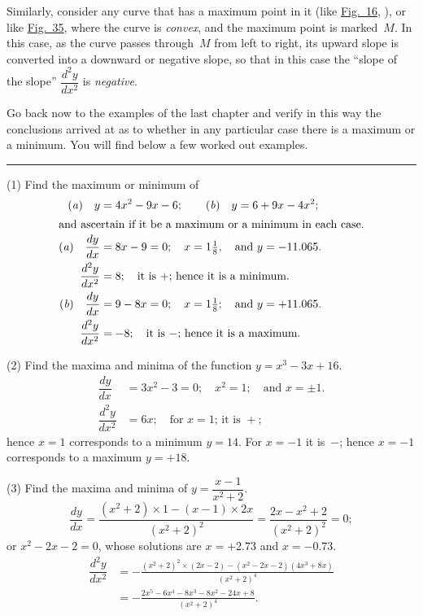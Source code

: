 \documentclass[12pt]{book}[2005/09/16]
\newcommand{\DPPageSep}[2]{\Pagelabel{#2}}
\newcommand{\Pagelabel}[1]
  {\phantomsection\label{#1}}
\newcommand{\Pageref}[2][p.]{%
  \ifthenelse{\not\equal{#1}{}}{%
    \hyperref[#2]{#1~\pageref{#2}}%
  }{%
    \hyperref[#2]{\pageref{#2}}%
  }%
}
\newcommand{\Fig}[1]{\hyperref[fig:#1]{Fig.~#1}}
\newcommand{\tb}[1][1.5in]{%
  \pagebreak[0]\par{\centering\rule{#1}{0.5pt}\pagebreak[3]\par}%
}
\newcommand{\DPtypo}[2]{#2}%
\begin{document}
Similarly, consider any curve that has a maximum
point in it (like \Fig{16}, \Pageref{fig:16}), or like \Fig{35}, where %
the curve is \emph{convex}, and the maximum point is
marked~$M$. In this case, as the curve passes through~$M$
from left to right, its upward slope is converted
\DPPageSep{127.png}{115}%
into a downward or negative slope, so that in this
case the ``slope of the slope'' $\dfrac{d^2y}{dx^2}$ is \emph{negative}.

Go back now to the examples of the last chapter
and verify in this way the conclusions arrived at as to
whether in any particular case there is a maximum
or a minimum. You will find below a few worked
out examples.

\tb

(1) Find the maximum or minimum of
\begin{align*}
\text{(\textit{a})}\quad y &= 4x^2-9x-6; \qquad \text{(\textit{b})}\quad y = 6 + 9x-4x^2; \\
\intertext{and ascertain if it be a maximum or a minimum in
each case.}
\text{(\textit{a})}\quad \dfrac{dy}{dx}
  &= 8x-9=0;\quad x=1\tfrac{1}{8},\quad \text{and } y = -11.065.\\
%
\dfrac{d^2y}{dx^2}
  &= 8;\quad \text{it is~$+$; hence it is a minimum.} \\
%
\text{(\textit{b})}\quad \DPtypo{\dfrac{dx}{dy}}{\dfrac{dy}{dx}}
  &= 9-8x=0;\quad x = 1\tfrac{1}{8};\quad \text{and } y = +11.065.\\
%
\dfrac{d^2y}{dx^2}
  &= -8;\quad \text{it is~$-$; hence it is a maximum.}
\end{align*}

(2) Find the maxima and minima of the function
$y = x^3-3x+16$.
\begin{align*}
\dfrac{dy}{dx}
  &= 3x^2 - 3 = 0;\quad x^2 = 1;\quad \text{and } x = ±1.\\
%
\dfrac{d^2y}{dx^2}
  &= 6x;\quad \text{for $x = 1$; it is~$+$};
\end{align*}
hence $x=1$ corresponds to a minimum $y=14$. For
$x=-1$ it is~$-$; hence $x=-1$ corresponds to a maximum
$y=+18$.
\DPPageSep{128.png}{116}%

(3) Find the maxima and minima of $y=\dfrac{x-1}{x^2+2}$.
\[
\frac{dy}{dx} = \frac{(x^2+2) × 1 - (x-1) × 2x}{(x^2+2)^2}
  = \frac{2x - x^2 + 2}{(x^2 + 2)^2} = 0;
\]
or $x^2 - 2x - 2 = 0$, whose solutions are $x =+2.73$ and
$x=-0.73$.
\begin{align*}
\dfrac{d^2y}{dx^2}
  &= - \frac{(x^2 + 2)^2 × (2x-2) - (x^2 - 2x - 2)(4x^3 + 8x)}{(x^2 + 2)^4} \\
  &= - \frac{2x^5 - 6x^4 - 8x^3 - 8x^2 - 24x + 8}{(x^2 + 2)^4}.
\end{align*}
\end{document}
